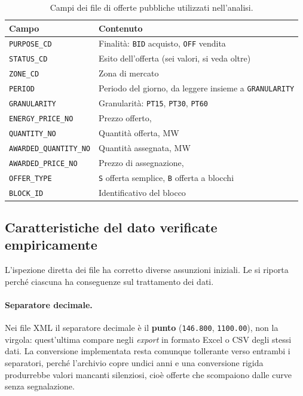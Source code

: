 \begin{table}[H]
\centering
\caption{Campi dei file di offerte pubbliche utilizzati nell'analisi.}
\label{tab:campi}
\begin{tabular}{@{}lp{8.5cm}@{}}
\toprule
\textbf{Campo} & \textbf{Contenuto} \\
\midrule
\texttt{PURPOSE\_CD}   & Finalità: \texttt{BID} acquisto, \texttt{OFF} vendita \\
\texttt{STATUS\_CD}    & Esito dell'offerta (sei valori, si veda oltre) \\
\texttt{ZONE\_CD}      & Zona di mercato \\
\texttt{PERIOD}        & Periodo del giorno, da leggere insieme a \texttt{GRANULARITY} \\
\texttt{GRANULARITY}   & Granularità: \texttt{PT15}, \texttt{PT30}, \texttt{PT60} \\
\texttt{ENERGY\_PRICE\_NO}    & Prezzo offerto, \euromwh{} \\
\texttt{QUANTITY\_NO}         & Quantità offerta, MW \\
\texttt{AWARDED\_QUANTITY\_NO}& Quantità assegnata, MW \\
\texttt{AWARDED\_PRICE\_NO}   & Prezzo di assegnazione, \euromwh{} \\
\texttt{OFFER\_TYPE}          & \texttt{S} offerta semplice, \texttt{B} offerta a blocchi \\
\texttt{BLOCK\_ID}            & Identificativo del blocco \\
\bottomrule
\end{tabular}
\end{table}

\subsection{Caratteristiche del dato verificate empiricamente}
\label{sec:caratteristiche}

L'ispezione diretta dei file ha corretto diverse assunzioni iniziali. Le si riporta perch\'e
ciascuna ha conseguenze sul trattamento dei dati.

\paragraph{Separatore decimale.} Nei file XML il separatore decimale \`e il \textbf{punto}
(\texttt{146.800}, \texttt{1100.00}), non la virgola: quest'ultima compare negli \emph{export}
in formato Excel o CSV degli stessi dati. La conversione implementata resta comunque
tollerante verso entrambi i separatori, perch\'e l'archivio copre undici anni e una
conversione rigida produrrebbe valori mancanti silenziosi, cio\`e offerte che scompaiono dalle
curve senza segnalazione.

